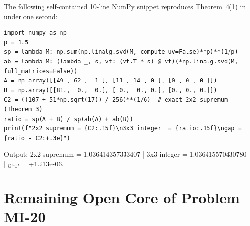 \documentclass[10pt,letterpaper]{article}
\begin{document}
The following self-contained 10-line NumPy snippet reproduces Theorem~4(1) in under one second:
\begin{tcolorbox}[codebox]
\begin{lstlisting}
import numpy as np
p = 1.5
sp = lambda M: np.sum(np.linalg.svd(M, compute_uv=False)**p)**(1/p)
ab = lambda M: (lambda _, s, vt: (vt.T * s) @ vt)(*np.linalg.svd(M, full_matrices=False))
A = np.array([[49., 62., -1.], [11., 14., 0.], [0., 0., 0.]])
B = np.array([[81.,  0.,  0.], [ 0.,  0., 0.], [0., 0., 0.]])
C2 = ((107 + 51*np.sqrt(17)) / 256)**(1/6)  # exact 2x2 supremum (Theorem 3)
ratio = sp(A + B) / sp(ab(A) + ab(B))
print(f"2x2 supremum = {C2:.15f}\n3x3 integer  = {ratio:.15f}\ngap = {ratio - C2:+.3e}")
\end{lstlisting}
\end{tcolorbox}
\vspace{-2pt}
{\ttfamily\footnotesize\color{ink} Output: 2x2 supremum = 1.036414357333407 \;|\; 3x3 integer = 1.036415570430780 \;|\; gap = +1.213e-06.}

\section{Remaining Open Core of Problem MI-20}
\end{document}
